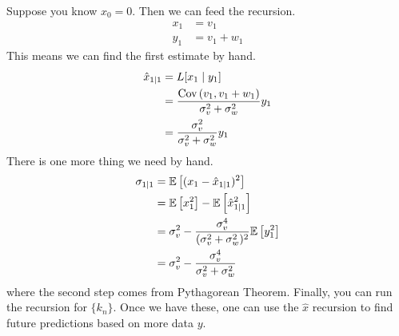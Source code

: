 \begin{example}
    Suppose you know $x_0 = 0$. Then we can feed the recursion.
    \begin{align*}
        x_1 &= v_1 \\
        y_1 &= v_1 + w_1
    \end{align*}
    This means we can find the first estimate by hand.
    \begin{align*}
        \hat{x}_{1 \mid 1} &= L[x_1 \mid y_1] \\
        &= \frac{\text{Cov}\left( v_1, v_1 + w_1 \right)}{\sigma_v^2 + \sigma_w^2} y_1 \\
        &= \frac{\sigma_v^2}{\sigma_v^2 + \sigma_w^2} y_1 \\
    \end{align*}
    There is one more thing we need by hand.
    \begin{align*}
        \sigma_{1 \mid 1} &= \mathbb{E}\left[ (x_1 - \hat{x}_{1 \mid 1})^2 \right] \\
        &= \mathbb{E}\left[ x_1^2 \right] - \mathbb{E}\left[ \hat{x}_{1 \mid 1}^2 \right] \\
        &= \sigma_v^2 - \frac{\sigma_v^4}{(\sigma_v^2 + \sigma_w^2)^2} \mathbb{E}\left[ y_1^2 \right] \\
        &= \sigma_v^2 - \frac{\sigma_v^4}{\sigma_v^2 + \sigma_w^2}
    \end{align*}
    where the second step comes from Pythagorean Theorem.
    Finally, you can run the recursion for $\{k_n\}$. Once we have these, one can use the $\hat{x}$ recursion to find future predictions based on more data $y$.
\end{example}